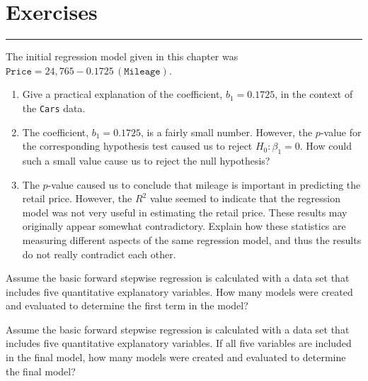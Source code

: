 \documentclass[
]{report}
\begin{document}
\section*{\texorpdfstring{\textbf{Exercises}}{Exercises}}\label{exercises-2}

\vspace{-2em}

\noindent

\rule{\linewidth}{0.4pt}

\renewcommand{\theexcountlr}{E.\arabic{excountlr}}

\begin{list}{E..}{ \setlength{\itemsep}{1.2em}}

  \item The initial regression model given in this chapter was $\texttt{Price} = 24,\!765 - 0.1725\,(\texttt{Mileage})$.
    \begin{enumerate}
      \item Give a practical explanation of the coefficient, $b_1 = 0.1725$, in the context of the \texttt{Cars} data.
      \item The coefficient, $b_1 = 0.1725$, is a fairly small number. However, the $p$-value for the corresponding hypothesis test caused us to reject $H_0\!: \beta_1 = 0$. How could such a small value cause us to reject the null hypothesis?
      \item The $p$-value caused us to conclude that mileage is important in predicting the retail price. However, the $R^2$ value seemed to indicate that the regression model was not very useful in estimating the retail price. These results may originally appear somewhat contradictory. Explain how these statistics are measuring different aspects of the same regression model, and thus the results do not really contradict each other.
    \end{enumerate}

  \item Assume the basic forward stepwise regression is calculated with a data set that includes five quantitative explanatory variables. How many models were created and evaluated to determine the first term in the model?

  \item Assume the basic forward stepwise regression is calculated with a data set that includes five quantitative explanatory variables. If all five variables are included in the final model, how many models were created and evaluated to determine the final model?


\end{list}
\end{document}
